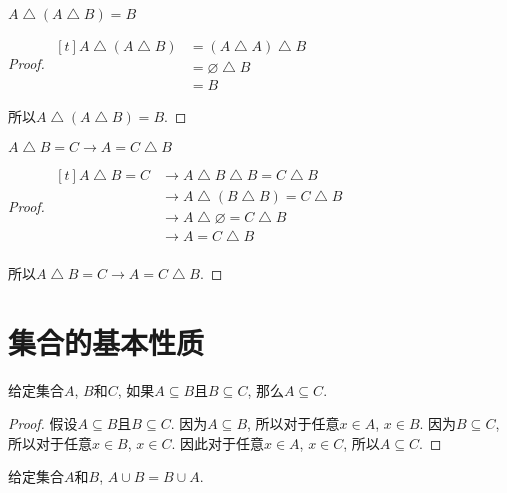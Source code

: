 \begin{proposition}
	$A\bigtriangleup (A\bigtriangleup B)=B$
\end{proposition}

\begin{proof}
	$\begin{aligned}[t]
		A\bigtriangleup (A\bigtriangleup B) & =(A\bigtriangleup A)\bigtriangleup B \\
		& =\varnothing \bigtriangleup B \\
		& =B
	\end{aligned}$
	
	所以$A\bigtriangleup (A\bigtriangleup B)=B$.
\end{proof}

\begin{proposition}
	$A\bigtriangleup B=C\rightarrow A=C\bigtriangleup B$
\end{proposition}

\begin{proof}
	$\begin{aligned}[t]
		A\bigtriangleup B=C & \rightarrow A\bigtriangleup B\bigtriangleup B=C\bigtriangleup B \\
		& \rightarrow A\bigtriangleup (B\bigtriangleup B)=C\bigtriangleup B \\
		& \rightarrow A\bigtriangleup \varnothing=C\bigtriangleup B \\
		& \rightarrow A=C\bigtriangleup B \\
	\end{aligned}$
	
	所以$A\bigtriangleup B=C\rightarrow A=C\bigtriangleup B$.
\end{proof}

\section{集合的基本性质}
\begin{theorem}
	给定集合$A$, $B$和$C$, 如果$A\subseteq B$且$B\subseteq C$, 那么$A\subseteq C$.
\end{theorem}

\begin{proof}
	假设$A\subseteq B$且$B\subseteq C$. 因为$A\subseteq B$, 所以对于任意$x\in A$, $x\in B$. 因为$B\subseteq C$, 所以对于任意$x\in B$, $x\in C$. 因此对于任意$x\in A$, $x\in C$, 所以$A\subseteq C$.
\end{proof}

\begin{proposition}
	给定集合$A$和$B$, $A\cup B=B\cup A$.
\end{proposition}

